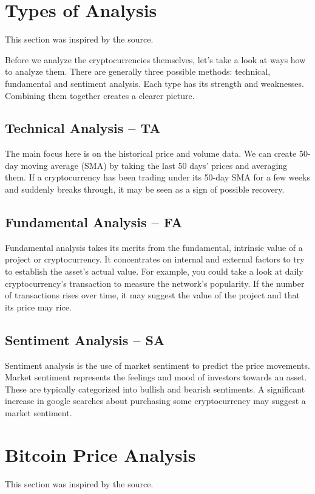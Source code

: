\section{Types of Analysis}
This section was inspired by the \cite{binance:bitcoin-price-history} source.

Before we analyze the cryptocurrencies themselves, let's take a look at ways how to analyze them. There are generally three possible methods: technical, fundamental and sentiment analysis. Each type has its strength and weaknesses. Combining them together creates a clearer picture.

\subsection*{Technical Analysis -- TA}
The main focus here is on the historical price and volume data. We can create 50-day moving average (SMA) by taking the last 50 days' prices and averaging them. If a cryptocurrency has been trading under its 50-day SMA for a few weeks and suddenly breaks through, it may be seen as a sign of possible recovery.

\subsection*{Fundamental Analysis -- FA}
Fundamental analysis takes its merits from the fundamental, intrinsic value of a project or cryptocurrency. It concentrates on internal and external factors to try to establish the asset's actual value. For example, you could take a look at daily cryptocurrency's transaction to measure the network's popularity. If the number of transactions rises over time, it may suggest the value of the project and that its price may rice.

\subsection*{Sentiment Analysis -- SA}
Sentiment analysis is the use of market sentiment to predict the price movements. Market sentiment represents the feelings and mood of investors towards an asset. These are typically categorized into bullish and bearish sentiments. A significant increase in google searches about purchasing some cryptocurrency may suggest a market sentiment.

\section{Bitcoin Price Analysis}
This section was inspired by the \cite{binance:bitcoin-price-history} source.

